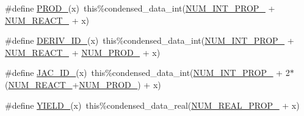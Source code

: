\begin{DoxyCompactItemize}
\item 
\#define \mbox{\hyperlink{rxn__arrhenius_8_f90_a9fda90058c6a41b1dda6ded03321c4da}{P\+R\+O\+D\+\_\+}}(x)~this\%condensed\+\_\+data\+\_\+int(\mbox{\hyperlink{rxn__arrhenius_8_f90_a13ba1b28e3d8a5e60eec52ce6bbabe4f}{N\+U\+M\+\_\+\+I\+N\+T\+\_\+\+P\+R\+O\+P\+\_\+}} + \mbox{\hyperlink{rxn__arrhenius_8_f90_a05ef845cf6ed7ab9a774440c42af34fa}{N\+U\+M\+\_\+\+R\+E\+A\+C\+T\+\_\+}} + x)
\item 
\#define \mbox{\hyperlink{rxn__arrhenius_8_f90_af9fc34858d09e71d3cffd88cf942bdf9}{D\+E\+R\+I\+V\+\_\+\+I\+D\+\_\+}}(x)~this\%condensed\+\_\+data\+\_\+int(\mbox{\hyperlink{rxn__arrhenius_8_f90_a13ba1b28e3d8a5e60eec52ce6bbabe4f}{N\+U\+M\+\_\+\+I\+N\+T\+\_\+\+P\+R\+O\+P\+\_\+}} + \mbox{\hyperlink{rxn__arrhenius_8_f90_a05ef845cf6ed7ab9a774440c42af34fa}{N\+U\+M\+\_\+\+R\+E\+A\+C\+T\+\_\+}} + \mbox{\hyperlink{rxn__arrhenius_8_f90_acf951e890da75cd2d503ed6ce8211fc2}{N\+U\+M\+\_\+\+P\+R\+O\+D\+\_\+}} + x)
\item 
\#define \mbox{\hyperlink{rxn__arrhenius_8_f90_ab831aae98d4453927c63a93f55ee5a86}{J\+A\+C\+\_\+\+I\+D\+\_\+}}(x)~this\%condensed\+\_\+data\+\_\+int(\mbox{\hyperlink{rxn__arrhenius_8_f90_a13ba1b28e3d8a5e60eec52ce6bbabe4f}{N\+U\+M\+\_\+\+I\+N\+T\+\_\+\+P\+R\+O\+P\+\_\+}} + 2$\ast$(\mbox{\hyperlink{rxn__arrhenius_8_f90_a05ef845cf6ed7ab9a774440c42af34fa}{N\+U\+M\+\_\+\+R\+E\+A\+C\+T\+\_\+}}+\mbox{\hyperlink{rxn__arrhenius_8_f90_acf951e890da75cd2d503ed6ce8211fc2}{N\+U\+M\+\_\+\+P\+R\+O\+D\+\_\+}}) + x)
\item 
\#define \mbox{\hyperlink{rxn__arrhenius_8_f90_a9ae244708fd9c438bf840ed319733651}{Y\+I\+E\+L\+D\+\_\+}}(x)~this\%condensed\+\_\+data\+\_\+real(\mbox{\hyperlink{rxn__arrhenius_8_f90_aa9808eb54fa06bcf890dd1aa1fc6ca5b}{N\+U\+M\+\_\+\+R\+E\+A\+L\+\_\+\+P\+R\+O\+P\+\_\+}} + x)
\end{DoxyCompactItemize}
